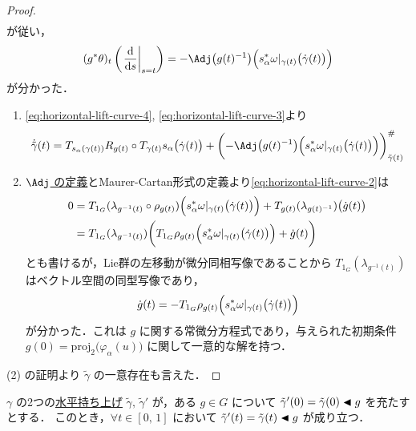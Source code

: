 \documentclass[geometry_main]{subfiles}
\begin{document}
\begin{proof}
\begin{align}
    \end{align}
    が従い，
    \begin{align}
        \label{eq:horizontal-lift-curve-3}
        (g^* \theta)_t \left( \eval{\dv{}{s}}_{s=t} \right) = -\Adj \bigl( g(t)^{-1} \bigr) \Bigl( s_\alpha^* \omega|_{\gamma(t)}\bigl(\dot{\gamma}(t)\bigr) \Bigr)
    \end{align}
    が分かった．
    \begin{enumerate}
        \item \eqref{eq:horizontal-lift-curve-4}, \eqref{eq:horizontal-lift-curve-3}より
        \begin{align}
            \dot{\tilde{\gamma}} (t) = T_{s_\alpha(\gamma(t))} R_{g(t)} \circ T_{\gamma(t)}s_\alpha \bigl(\dot{\gamma}(t)\bigr) + \biggl( -\Adj \bigl( g(t)^{-1} \bigr) \Bigl( s_\alpha^* \omega|_{\gamma(t)}\bigl(\dot{\gamma}(t)\bigr) \Bigr) \biggr)^\#_{\tilde{\gamma}(t)}
        \end{align}
        \item \hyperref[def:Lie-adj]{$\Adj$ の定義}とMaurer-Cartan形式の定義より\eqref{eq:horizontal-lift-curve-2}は
        \begin{align}
            0
            &= T_{1_G} (\lambda_{g^{-1}(t)} \circ \rho_{g(t)}) \Bigl( s_\alpha^* \omega|_{\gamma(t)} \bigl( \dot{\gamma}(t) \bigr)  \Bigr) + T_{g(t)} (\lambda_{g(t)^{-1}}) \bigl( \dot{g}(t) \bigr) \\
            &= T_{1_G} (\lambda_{g^{-1}(t)}) \biggl( T_{1_G} \rho_{g(t)} \Bigl( s_\alpha^* \omega|_{\gamma(t)} \bigl( \dot{\gamma}(t) \bigr)  \Bigr) + \dot{g}(t) \biggr)
        \end{align}
        とも書けるが，Lie群の左移動が微分同相写像であることから $T_{1_G} (\lambda_{g^{-1}(t)})$ はベクトル空間の同型写像であり，
        \begin{align}
            \dot{g}(t) = -T_{1_G} \rho_{g(t)} \Bigl(s_\alpha^* \omega|_{\gamma(t)} \bigl( \dot{\gamma}(t) \bigr)  \Bigr)
        \end{align}
        が分かった．これは $g$ に関する常微分方程式であり，与えられた初期条件 $g(0) = \mathrm{proj}_2 \bigl( \varphi_\alpha(u) \bigr)$ に関して一意的な解を持つ．
    \end{enumerate}
    (2) の証明より $\tilde{\gamma}$ の一意存在も言えた．
\end{proof}

\begin{myprop}[label=prop:horizontal-lift-init]{}
    $\gamma$ の2つの\hyperref[def:horizontal-lift-curve]{水平持ち上げ} $\tilde{\gamma},\, \tilde{\gamma}'$ が，ある $g \in G$ について $\tilde{\gamma}'(0) = \tilde{\gamma}(0) \blacktriangleleft g$ を充たすとする．
    このとき，$\forall t \in [0,\, 1]$ において $\tilde{\gamma}'(t) = \tilde{\gamma}(t) \blacktriangleleft g$ が成り立つ．
\end{myprop}
\end{document}
